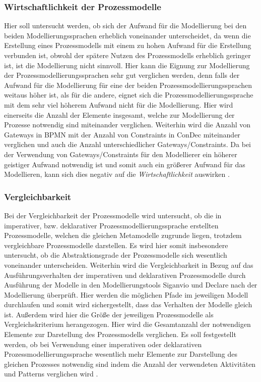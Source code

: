 \subsubsection{Wirtschaftlichkeit der Prozessmodelle}
Hier soll untersucht werden, ob sich der Aufwand für die Modellierung bei den beiden Modellierungssprachen erheblich voneinander unterscheidet, da wenn die Erstellung eines Prozessmodells mit einem zu hohen Aufwand für die Erstellung verbunden ist, obwohl der spätere Nutzen des Prozessmodells erheblich geringer ist, ist die Modellierung nicht sinnvoll. Hier kann die Eignung zur Modellierung der Prozessmodellierungssprachen sehr gut verglichen werden, denn falls der Aufwand für die Modellierung für eine der beiden Prozessmodellierungssprachen weitaus höher ist, als für die andere, eignet sich die Prozessmodellierungssprache mit dem sehr viel höherem Aufwand nicht für die Modellierung.\newline
Hier wird einerseits die Anzahl der Elemente insgesamt, welche zur Modellierung der Prozesse notwendig sind miteinander verglichen. Weiterhin wird die Anzahl von Gateways in BPMN mit der Anzahl von Constraints in ConDec miteinander verglichen und auch die Anzahl unterschiedlicher Gateways/Constraints. Da bei der Verwendung von Gateways/Constraints für den Modellierer ein höherer geistiger Aufwand notwendig ist und somit auch ein größerer Aufwand für das Modellieren, kann sich dies negativ auf die \textit{Wirtschaftlichkeit} auswirken \cite{freund2007, journals95, leimeister2012}.


\subsubsection{Vergleichbarkeit}
Bei der Vergleichbarkeit der Prozessmodelle wird untersucht, ob die in imperativer, bzw. deklarativer Prozessmodellierungssprache erstellten Prozessmodelle, welchen die gleichen Metamodelle zugrunde liegen, trotzdem vergleichbare Prozessmodelle darstellen. Es wird hier somit insbesondere untersucht, ob die Abstraktionsgrade der Prozessmodelle sich wesentlich voneinander unterscheiden. Weiterhin wird die Vergleichbarkeit in Bezug auf das Ausführungsverhalten der imperativen und deklarativen Prozessmodelle durch Ausführung der Modelle in den Modellierungstools Siganvio und Declare nach der Modellierung überprüft. Hier werden die möglichen Pfade im jeweiligen Modell durchlaufen und somit wird sichergestellt, dass das Verhalten der Modelle gleich ist. Außerdem wird hier die Größe der jeweiligen Prozessmodelle als Vergleichskriterium herangezogen. Hier wird die Gesamtanzahl der notwendigen Elemente zur Darstellung des Prozessmodells verglichen. Es soll festgestellt werden, ob bei Verwendung einer imperativen oder deklarativen Prozessmodellierungssprache wesentlich mehr Elemente zur Darstellung des gleichen Prozesses notwendig sind indem die Anzahl der verwendeten Aktivitäten und Patterns verglichen wird \cite{leimeister2012, journals95, freund2007,reinshagen2009}.

